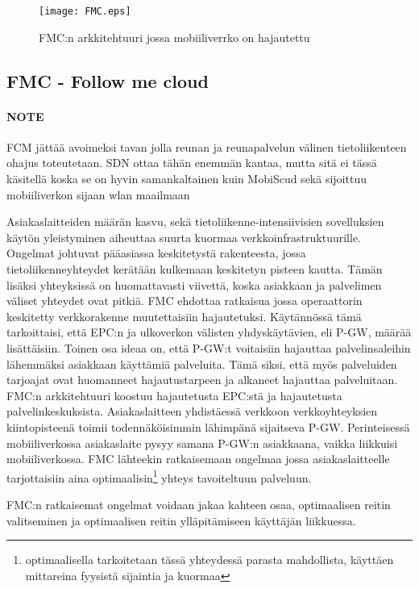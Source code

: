 \begin{figure}[tb]
\texttt{[image: FMC.eps]}
\caption{FMC:n arkkitehtuuri jossa mobiiliverrko on hajautettu} \label{fig:fmc}
\end{figure}

\subsection{FMC - Follow me cloud} \label{fmc}
\paragraph{NOTE} FCM jättää avoimeksi tavan jolla reunan ja reunapalvelun välinen tietoliikenteen ohajus toteutetaan. SDN ottaa tähän enemmän kantaa, mutta sitä ei tässä käsitellä koska se on hyvin samankaltainen kuin MobiScud sekä sijoittuu mobiiliverkon sijaan wlan maailmaan

Asiakaslaitteiden määrän kasvu, sekä tietoliikenne-intensiivisien sovelluksien käytön yleistyminen aiheuttaa suurta kuormaa verkkoinfrastruktuurille. Ongelmat johtuvat pääasiassa keskitetystä rakenteesta, jossa tietoliikenneyhteydet kerätään kulkemaan keskitetyn pisteen kautta. Tämän lisäksi yhteyksissä on huomattavasti viivettä, koska asiakkaan ja palvelimen väliset yhteydet ovat pitkiä. FMC ehdottaa ratkaisua jossa operaattorin keskitetty verkkorakenne muutettaisiin hajautetuksi. \cite{taleb2013follow}
Käytännössä tämä tarkoittaisi, että EPC:n ja ulkoverkon välisten yhdyskäytävien, eli P-GW, määrää lisättäisiin. 
Toinen osa ideaa on, että P-GW:t voitaisiin hajauttaa palvelinsaleihin lähemmäksi asiakkaan käyttämiä palveluita. Tämä siksi, että myös palveluiden tarjoajat ovat huomanneet hajautustarpeen ja alkaneet hajauttaa palveluitaan. 
FMC:n arkkitehtuuri koostuu hajautetusta EPC:stä ja hajautetusta palvelinkeskuksista. Asiakaslaitteen yhdistäessä verkkoon verkkoyhteyksien kiintopisteenä toimii todennäköisimmin lähimpänä sijaitseva P-GW. Perinteisessä mobiiliverkossa asiakaslaite pysyy samana P-GW:n asiakkaana, vaikka liikkuisi mobiiliverkossa. FMC lähteekin ratkaisemaan ongelmaa jossa asiakaslaitteelle tarjottaisiin aina optimaalisin\footnote{optimaalisella tarkoitetaan tässä yhteydessä parasta mahdollista, käyttäen mittareina fyysistä sijaintia ja kuormaa} yhteys tavoiteltuun palveluun.

FMC:n ratkaisemat ongelmat voidaan jakaa kahteen osaa, optimaalisen reitin valitseminen ja optimaalisen reitin ylläpitämiseen käyttäjän liikkuessa. 

